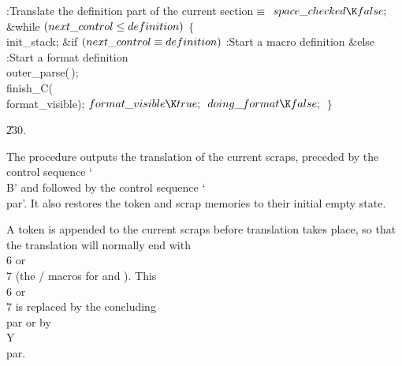 \Y\B\4:Translate the definition part of the current section\X${}\equiv{}$\6
$\\{space\_checked}\K\\{false};{}$\6
\&{while} ${}(\\{next\_control}\le\\{definition}){}$\5
${}\{{}$\1\6
\\{init\_stack};\6
\&{if} ${}(\\{next\_control}\equiv\\{definition}){}$\1\5
:Start a macro definition\X\2\6
\&{else}\1\5
:Start a format definition\X\2\6
\\{outer\_parse}(\,);\6
\\{finish\_C}(\\{format\_visible});\6
${}\\{format\_visible}\K\\{true};{}$\6
${}\\{doing\_format}\K\\{false};{}$\6
\4${}\}{}$\2\par
\U230.\fi

The  procedure outputs the translation of the current
scraps, preceded by the control sequence `\.{\\B}' and followed by the
control sequence `\.{\\par}'. It also restores the token and scrap
memories to their initial empty state.

A  token is appended to the current scraps before translation
takes place, so that the translation will normally end with \.{\\6} or
\.{\\7} (the \TEX/ macros for  and ). This \.{%
\\6} or
\.{\\7} is replaced by the concluding \.{\\par} or by \.{\\Y\\par}.

